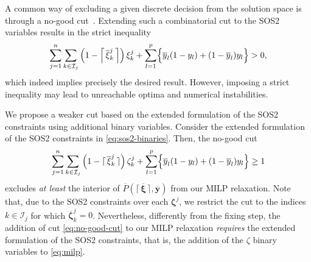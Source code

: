 \documentclass[pdflatex,sn-mathphys-num]{sn-jnl}%
\newcommand{\new}[1]{#1}
\begin{document}
\new{%
A common way of excluding a given discrete decision from the solution space is through a no-good cut~\citep{DAMBROSIO2010341,balas_jeroslaw_72}.
Extending such a combinatorial cut to the SOS2 variables results in the strict inequality
\begin{equation}\label{eq:cut}
    \sum_{j=1}^{n} \sum_{k\in \mathcal{I}_j} \left( 1-\left\lceil \,\overline{\xi}^j_{k}\, \right\rceil \right)  \xi^j_{k}   + \sum_{l=1}^{p} \Bigl \{ \overline{y}_l (1-y_l) + (1-\overline{y}_l) y_l\Bigr \} > 0
,\end{equation}
which indeed implies precisely the desired result.
However, imposing a strict inequality may lead to unreachable optima and numerical instabilities.
}

\new{%
We propose a weaker cut based on the extended formulation of the SOS2 constraints using additional binary variables.
Consider the extended formulation of the SOS2 constraints in \eqref{eq:sos2-binaries}.
Then, the no-good cut
\begin{equation}\label{eq:no-good-cut}
    \sum_{j=1}^{n} \sum_{k\in \mathcal{I}_j} \left(1 - \lceil\, \overline{\xi}^j_{k} \,\rceil \right) \zeta^j_{k}  + \sum_{l=1}^{p} \Bigl \{ \overline{y}_l (1-y_l) + (1-\overline{y}_l) y_l\Bigr \} \ge 1
\end{equation}
excludes \emph{at least} the interior of $\overline{P}(\lceil\,\overline{\bm{\xi}} \,\rceil,\overline{\bm{y}})$ from our MILP relaxation.
Note that, due to the SOS2 constraints over each $\bm{\zeta}^j$, we restrict the cut to the indices $k\in\mathcal{I}_j$ for which $\overline{\bm{\zeta}}^j_k = 0$.
Nevertheless, differently from the fixing step, the addition of cut \eqref{eq:no-good-cut} to our MILP relaxation \emph{requires} the extended formulation of the SOS2 constraints, that is, the addition of the $\zeta$ binary variables to \ref{eq:milp}.
}
\end{document}
